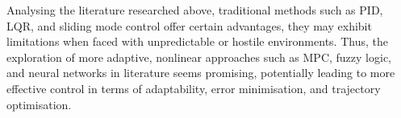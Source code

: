 Analysing the literature researched above, traditional methods such as PID, LQR, and sliding mode control offer certain advantages, they may exhibit limitations when faced with unpredictable or hostile environments. Thus, the exploration of more adaptive, nonlinear approaches such as MPC, fuzzy logic, and neural networks in literature seems promising, potentially leading to more effective control in terms of adaptability, error minimisation, and trajectory optimisation.

